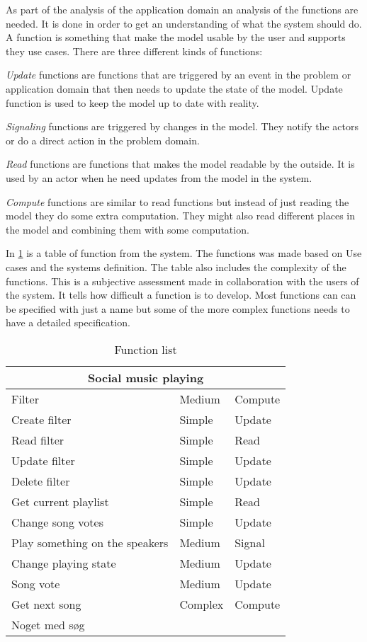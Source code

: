 As part of the analysis of the application domain an analysis of the functions are needed. It is done in order to get an understanding of what the system should do. A function is something that make the model usable by the user and supports they use cases. There are three different kinds of functions:

\emph{Update} functions are functions that are triggered by an event in the problem or application domain that then needs to update the state of the model. Update function is used to keep the model up to date with reality.

\emph{Signaling} functions are triggered by changes in the model. They notify the actors or do a direct action in the problem domain.

\emph{Read} functions are functions that makes the model readable by the outside. It is used by an actor when he need updates from the model in the system.

\emph{Compute} functions are similar to  read functions but instead of just reading the model they do some extra computation. They might also read different places in the model and combining them with some computation.

In \cref{table:functionlist} is a table of function from the system. The functions was made based on Use cases and the systems definition. The table also includes the complexity of the functions. This is a subjective assessment made in collaboration with the users of the system. It tells how difficult a function is to develop. Most functions can can be specified with just a name but some of the more complex functions needs to have a detailed specification.

\begin{table}[h]
\begin{tabular}{lll}
\hline
\multicolumn{3}{c}{\textbf{Social music playing}} \\ \hline
Filter                         & Medium & Compute \\
Create filter                  & Simple & Update  \\
Read filter                    & Simple & Read    \\
Update filter                  & Simple & Update  \\
Delete filter                  & Simple & Update  \\
Get current playlist           & Simple & Read    \\
Change song votes              & Simple & Update  \\
Play something on the speakers & Medium & Signal  \\
Change playing state           & Medium & Update  \\
Song vote                      & Medium & Update  \\
Get next song                  & Complex & Compute \\
Noget med søg                  &        &         \\ \hline
\end{tabular}
\caption{Function list}
\label{table:functionlist}
\end{table}

